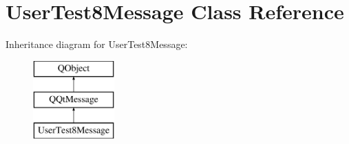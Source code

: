 \hypertarget{class_user_test8_message}{}\section{User\+Test8\+Message Class Reference}
\label{class_user_test8_message}
Inheritance diagram for User\+Test8\+Message\+:\begin{figure}[H]
\begin{center}
\leavevmode
\includegraphics[height=3.000000cm]{class_user_test8_message}
\end{center}
\end{figure}
